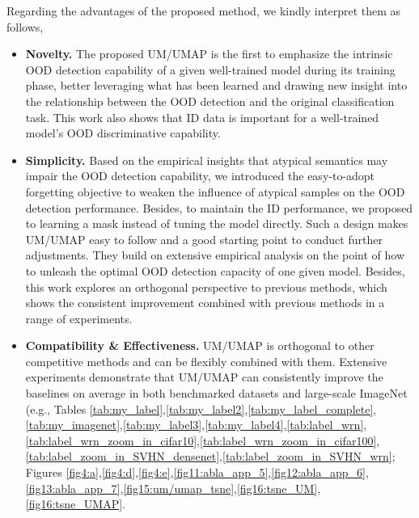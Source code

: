 \documentclass{article}
\theoremstyle{plain}
\theoremstyle{definition}
\theoremstyle{remark}
\begin{document}
Regarding the advantages of the proposed method, we kindly interpret them as follows,
\begin{itemize}
    \item \textbf{Novelty.} The proposed UM/UMAP is the first to emphasize the intrinsic OOD detection capability of a given well-trained model during its training phase, better leveraging what has been learned and drawing new insight into the relationship between the OOD detection and the original classification task. This work also shows that ID data is important for a well-trained model's OOD discriminative capability.
    \item \textbf{Simplicity.} Based on the empirical insights that atypical semantics may impair the OOD detection capability, we introduced the easy-to-adopt forgetting objective to weaken the influence of atypical samples on the OOD detection performance. Besides, to maintain the ID performance, we proposed to learning a mask instead of tuning the model directly. Such a design makes UM/UMAP easy to follow and a good starting point to conduct further adjustments. They build on extensive empirical analysis on the point of how to unleash the optimal OOD detection capacity of one given model. Besides, this work explores an orthogonal perspective to previous methods, which shows the consistent improvement combined with previous methods in a range of experiments.
    \item \textbf{Compatibility \& Effectiveness.} UM/UMAP is orthogonal to other competitive methods and can be flexibly combined with them. Extensive experiments demonstrate that UM/UMAP can consistently improve the baselines on average in both benchmarked datasets and large-scale ImageNet (e.g., Tables \ref{tab:my_label},\ref{tab:my_label2},\ref{tab:my_label_complete},\ref{tab:my_imagenet},\ref{tab:my_label3},\ref{tab:my_label4},\ref{tab:label_wrn},\ref{tab:label_wrn_zoom_in_cifar10},\ref{tab:label_wrn_zoom_in_cifar100},\ref{tab:label_zoom_in_SVHN_densenet},\ref{tab:label_zoom_in_SVHN_wrn}; Figures \ref{fig4:a},\ref{fig4:d},\ref{fig4:e},\ref{fig11:abla_app_5},\ref{fig12:abla_app_6},\ref{fig13:abla_app_7},\ref{fig15:um/umap_tsne},\ref{fig16:tsne_UM},\ref{fig16:tsne_UMAP}.
\end{itemize}
\end{document}

